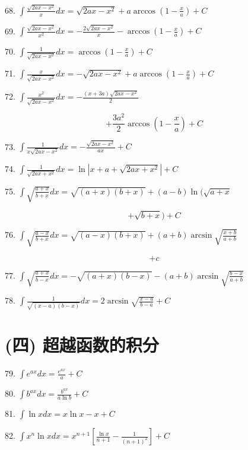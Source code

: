 \documentclass[lang=cn,newtx,12pt,scheme=chinese]{elegantbook}
\begin{document}
68. \(\int \frac{\sqrt{{2ax} - {x}^{2}}}{x}{dx} = \sqrt{{2ax} - {x}^{2}} + a\arccos \left( {1 - \frac{x}{a}}\right) + C\)

69. \(\int \frac{\sqrt{{2ax} - {x}^{2}}}{{x}^{2}}{dx} = - \frac{2\sqrt{{2ax} - {x}^{2}}}{x} - \arccos \left( {1 - \frac{x}{a}}\right) + C\)

70. \(\int \frac{1}{\sqrt{{2ax} - {x}^{2}}}{dx} = \arccos \left( {1 - \frac{x}{a}}\right) + C\)

71. \(\int \frac{x}{\sqrt{{2ax} - {x}^{2}}}{dx} = - \sqrt{{2ax} - {x}^{2}} + a\arccos \left( {1 - \frac{x}{a}}\right) + C\)

72. \(\int \frac{{x}^{2}}{\sqrt{{2ax} - {x}^{2}}}{dx} = - \frac{\left( {x + {3a}}\right) \sqrt{{2ax} - {x}^{2}}}{2}\)

\[
+ \frac{3{a}^{2}}{2}\arccos \left( {1 - \frac{x}{a}}\right) + C
\]

73. \(\int \frac{1}{x\sqrt{{2ax} - {x}^{2}}}{dx} = - \frac{\sqrt{{2ax} - {x}^{2}}}{ax} + C\)

74. \(\int \frac{1}{\sqrt{{2ax} + {x}^{2}}}{dx} = \ln \left| {x + a + \sqrt{{2ax} + {x}^{2}}}\right| + C\)

75. \(\int \sqrt{\frac{a + x}{b + x}}{dx} = \sqrt{\left( {a + x}\right) \left( {b + x}\right) } + \left( {a - b}\right) \ln (\sqrt{a + x}\)

\[
+ \sqrt{b + x}) + C
\]

76. \(\int \sqrt{\frac{a - x}{b + x}}{dx} = \sqrt{\left( {a - x}\right) \left( {b + x}\right) } + \left( {a + b}\right) \arcsin \sqrt{\frac{x + b}{a + b}}\)

\[
+ c
\]

77. \(\int \sqrt{\frac{a + x}{b - x}}{dx} = - \sqrt{\left( {a + x}\right) \left( {b - x}\right) } - \left( {a + b}\right) \arcsin \sqrt{\frac{b - x}{a + b}}\)

78. \(\int \frac{1}{\sqrt{\left( {x - a}\right) \left( {b - x}\right) }}{dx} = 2\arcsin \sqrt{\frac{x - a}{b - a}} + C\)

\section*{(四) 超越函数的积分}

79. \(\int {e}^{ax}{dx} = \frac{{e}^{ax}}{a} + C\)

80. \(\int {b}^{ax}{dx} = \frac{{b}^{ax}}{a\ln b} + C\)

81. \(\int \ln {xdx} = x\ln x - x + C\)

82. \(\int {x}^{n}\ln {xdx} = {x}^{n + 1}\left\lbrack {\frac{\ln x}{n + 1} - \frac{1}{{\left( n + 1\right) }^{2}}}\right\rbrack + C\)
\end{document}
